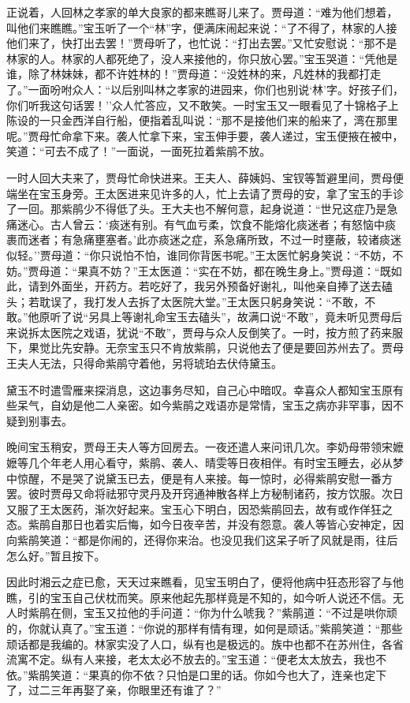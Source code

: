 正说着，人回林之孝家的单大良家的都来瞧哥儿来了。贾母道：``难为他们想着，叫他们来瞧瞧。''宝玉听了一个``林''字，便满床闹起来说：``了不得了，林家的人接他们来了，快打出去罢！''贾母听了，也忙说：``打出去罢。''又忙安慰说：``那不是林家的人。林家的人都死绝了，没人来接他的，你只放心罢。''宝玉哭道：``凭他是谁，除了林妹妹，都不许姓林的！''贾母道：``没姓林的来，凡姓林的我都打走了。''一面吩咐众人：``以后别叫林之孝家的进园来，你们也别说`林'字。好孩子们，你们听我这句话罢！''众人忙答应，又不敢笑。一时宝玉又一眼看见了十锦格子上陈设的一只金西洋自行船，便指着乱叫说：``那不是接他们来的船来了，湾在那里呢。''贾母忙命拿下来。袭人忙拿下来，宝玉伸手要，袭人递过，宝玉便掖在被中，笑道：``可去不成了！''一面说，一面死拉着紫鹃不放。

一时人回大夫来了，贾母忙命快进来。王夫人、薛姨妈、宝钗等暂避里间，贾母便端坐在宝玉身旁。王太医进来见许多的人，忙上去请了贾母的安，拿了宝玉的手诊了一回。那紫鹃少不得低了头。王大夫也不解何意，起身说道：``世兄这症乃是急痛迷心。古人曾云：`痰迷有别。有气血亏柔，饮食不能熔化痰迷者；有怒恼中痰裹而迷者；有急痛壅塞者。'此亦痰迷之症，系急痛所致，不过一时壅蔽，较诸痰迷似轻。''贾母道：``你只说怕不怕，谁同你背医书呢。''王太医忙躬身笑说：``不妨，不妨。''贾母道：``果真不妨？''王太医道：``实在不妨，都在晚生身上。''贾母道：``既如此，请到外面坐，开药方。若吃好了，我另外预备好谢礼，叫他亲自捧了送去磕头；若耽误了，我打发人去拆了太医院大堂。''王太医只躬身笑说：``不敢，不敢。''他原听了说``另具上等谢礼命宝玉去磕头''，故满口说``不敢''，竟未听见贾母后来说拆太医院之戏语，犹说``不敢''，贾母与众人反倒笑了。一时，按方煎了药来服下，果觉比先安静。无奈宝玉只不肯放紫鹃，只说他去了便是要回苏州去了。贾母王夫人无法，只得命紫鹃守着他，另将琥珀去伏侍黛玉。

黛玉不时遣雪雁来探消息，这边事务尽知，自己心中暗叹。幸喜众人都知宝玉原有些呆气，自幼是他二人亲密。如今紫鹃之戏语亦是常情，宝玉之病亦非罕事，因不疑到别事去。

晚间宝玉稍安，贾母王夫人等方回房去。一夜还遣人来问讯几次。李奶母带领宋嬷嬷等几个年老人用心看守，紫鹃、袭人、晴雯等日夜相伴。有时宝玉睡去，必从梦中惊醒，不是哭了说黛玉已去，便是有人来接。每一惊时，必得紫鹃安慰一番方罢。彼时贾母又命将祛邪守灵丹及开窍通神散各样上方秘制诸药，按方饮服。次日又服了王太医药，渐次好起来。宝玉心下明白，因恐紫鹃回去，故有或作佯狂之态。紫鹃自那日也着实后悔，如今日夜辛苦，并没有怨意。袭人等皆心安神定，因向紫鹃笑道：``都是你闹的，还得你来治。也没见我们这呆子听了风就是雨，往后怎么好。''暂且按下。

因此时湘云之症已愈，天天过来瞧看，见宝玉明白了，便将他病中狂态形容了与他瞧，引的宝玉自己伏枕而笑。原来他起先那样竟是不知的，如今听人说还不信。无人时紫鹃在侧，宝玉又拉他的手问道：``你为什么唬我？''紫鹃道：``不过是哄你顽的，你就认真了。''宝玉道：``你说的那样有情有理，如何是顽话。''紫鹃笑道：``那些顽话都是我编的。林家实没了人口，纵有也是极远的。族中也都不在苏州住，各省流寓不定。纵有人来接，老太太必不放去的。''宝玉道：``便老太太放去，我也不依。''紫鹃笑道：``果真的你不依？只怕是口里的话。你如今也大了，连亲也定下了，过二三年再娶了亲，你眼里还有谁了？''

